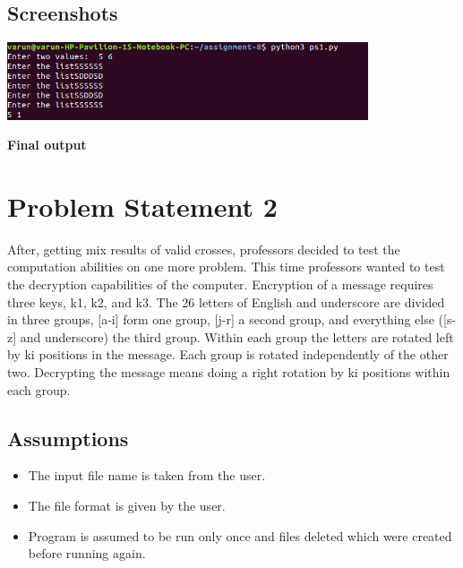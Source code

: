 \documentclass[12pt]{article}
\begin{document}
{\subsection{Screenshots}
\includegraphics[width=0.8\textwidth]{out1.png}
\begin{center}
\textbf{Final output}
\end{center}

\pagebreak
\section{Problem Statement 2}
{\textbf{}
After, getting mix results of valid crosses, professors decided to test the computation abilities on one more problem. This time professors wanted to test the decryption capabilities of the computer.
Encryption of  a message requires three keys, k1, k2, and k3. The 26 letters of English and underscore are divided in three groups,  [a-i] form one group, [j-r] a second group, and everything else ([s-z] and underscore) the third group. Within each group the letters are rotated left by ki positions in the message. Each group is rotated independently of the other two. Decrypting the message means doing a right rotation by ki positions within each group.

}

\subsection{Assumptions}
{
\begin{itemize}
\item The input file name is taken from the user.
\item The file format is given by the user.
\item Program is assumed to be run only once and files deleted which were created before running again.
\end{itemize}
}
}
\end{document}
